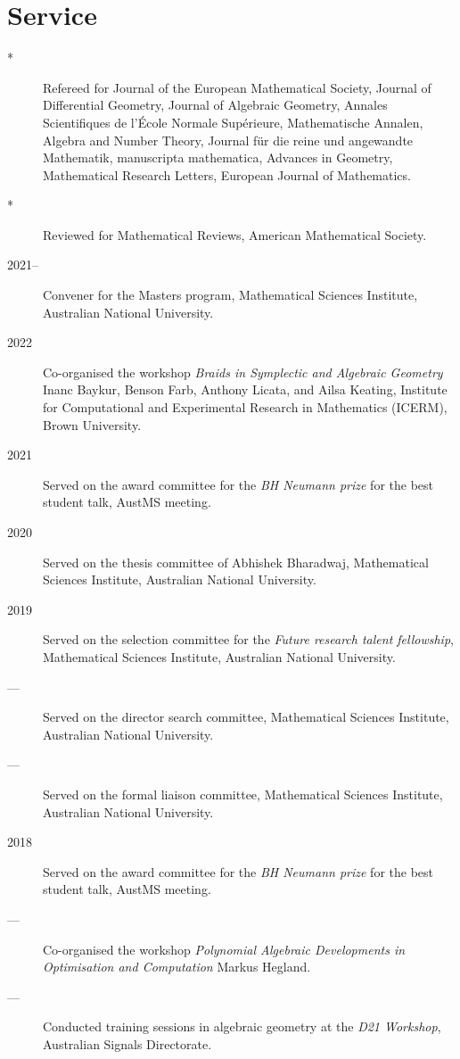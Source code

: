 \documentclass[11pt]{article}
\begin{document}
\section*{Service}
\label{sec:orgec188ac}
\label{orgc1720a3}
\begin{description}
\item[{*}] Refereed for Journal of the European Mathematical Society, Journal of Differential Geometry, Journal of Algebraic Geometry, Annales Scientifiques de l'École Normale Supérieure, Mathematische Annalen, Algebra and Number Theory, Journal für die reine und angewandte Mathematik, manuscripta mathematica, Advances in Geometry, Mathematical Research Letters, European Journal of Mathematics.
\item[{*}] Reviewed for Mathematical Reviews, American Mathematical Society.
\item[{2021--}] Convener for the Masters program, Mathematical Sciences Institute, Australian National University.
\item[{2022}] Co-organised the workshop \emph{Braids in Symplectic and Algebraic Geometry} Inanc Baykur, Benson Farb, Anthony Licata, and Ailsa Keating, Institute for Computational and Experimental Research in Mathematics (ICERM), Brown University.
\item[{2021}] Served on the award committee for the \emph{BH Neumann prize} for the best student talk, AustMS meeting.
\item[{2020}] Served on the thesis committee of Abhishek Bharadwaj, Mathematical Sciences Institute, Australian National University.
\item[{2019}] Served on the selection committee for the \emph{Future research talent fellowship}, Mathematical Sciences Institute, Australian National University.
\item[{---}] Served on the director search committee, Mathematical Sciences Institute, Australian National University.
\item[{---}] Served on the formal liaison committee, Mathematical Sciences Institute, Australian National University.
\item[{2018}] Served on the award committee for the \emph{BH Neumann prize} for the best student talk, AustMS meeting.
\item[{---}] Co-organised the workshop \emph{Polynomial Algebraic Developments in Optimisation and Computation} Markus Hegland.
\item[{---}] Conducted training sessions in algebraic geometry at the \emph{D21 Workshop}, Australian Signals Directorate.

\end{description}
\end{document}
